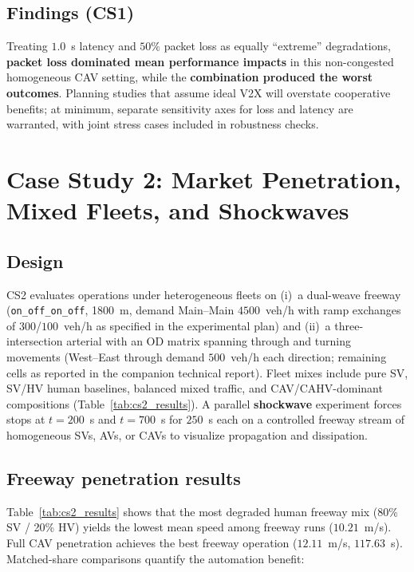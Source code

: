 \documentclass[numbered]{trbunofficial}
\begin{document}
\subsection{Findings (CS1)}
Treating $1.0$~s latency and $50\%$ packet loss as equally ``extreme'' degradations,
\textbf{packet loss dominated mean performance impacts} in this non-congested homogeneous CAV
setting, while the \textbf{combination produced the worst outcomes}. Planning studies that
assume ideal V2X will overstate cooperative benefits; at minimum, separate sensitivity axes for
loss and latency are warranted, with joint stress cases included in robustness checks.

\section{Case Study 2: Market Penetration, Mixed Fleets, and Shockwaves}
\label{sec:cs2}

\subsection{Design}
CS2 evaluates operations under heterogeneous fleets on (i)~a dual-weave freeway
(\texttt{on\_off\_on\_off}, 1800~m, demand Main--Main $4500$~veh/h with ramp exchanges of
$300$/$100$~veh/h as specified in the experimental plan) and (ii)~a three-intersection arterial
with an OD matrix spanning through and turning movements (West--East through demand
$500$~veh/h each direction; remaining cells as reported in the companion technical report).
Fleet mixes include pure SV, SV/HV human baselines, balanced mixed traffic, and CAV/CAHV-dominant
compositions (Table~\ref{tab:cs2_results}). A parallel \textbf{shockwave} experiment forces
stops at $t{=}200$~s and $t{=}700$~s for $250$~s each on a controlled freeway stream of
homogeneous SVs, AVs, or CAVs to visualize propagation and dissipation.

\subsection{Freeway penetration results}
Table~\ref{tab:cs2_results} shows that the most degraded human freeway mix
(80\% SV / 20\% HV) yields the lowest mean speed among freeway runs ($10.21$~m/s). Full CAV
penetration achieves the best freeway operation ($12.11$~m/s, $117.63$~s). Matched-share
comparisons quantify the automation benefit:
\end{document}
